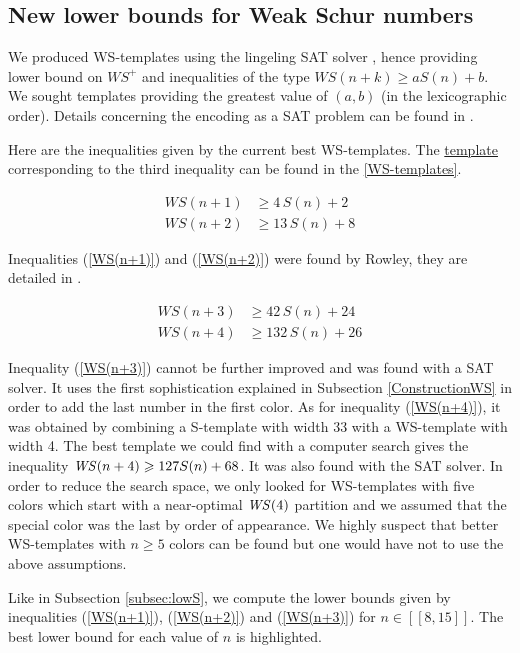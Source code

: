 \subsection{New lower bounds for Weak Schur numbers}

We produced WS-templates using the lingeling SAT solver \cite{Lingeling2017}, hence providing lower bound on \(WS^+\) 
and inequalities of the type \(WS(n+k) \geqslant a S(n) + b\). We sought templates providing the greatest value of \((a, b)\) 
(in the lexicographic order). Details concerning the encoding as a SAT problem can be found in \cite{Heule2017}.

\par
Here are the inequalities given by the current best WS-templates. The \hyperref[WS-templates]{template} 
corresponding to the third inequality can be found in the \ref{WS-templates}.

\begin{align}
	WS(n + 1) &\geqslant  4\,S(n)  +  2 \label{WS(n+1)} \\
	WS(n + 2) &\geqslant  13\,S(n)  +  8 \label{WS(n+2)} 
\end{align}

Inequalities (\ref{WS(n+1)}) and (\ref{WS(n+2)}) were found by Rowley, they are detailed in \cite{RowleyWS}.

\begin{align}
	WS(n + 3) &\geqslant  42\,S(n)  +  24 \label{WS(n+3)} \\
	WS(n + 4) &\geqslant  132\,S(n)  +  26 \label{WS(n+4)}
\end{align}

Inequality (\ref{WS(n+3)}) cannot be further improved and was found with a SAT solver. It uses the first 
sophistication explained in Subsection \ref{ConstructionWS} in order to add
the last number in the first color. As for inequality (\ref{WS(n+4)}), it was obtained by combining a S-template with 
width 33 with a WS-template with width 4. The best template we could find with a computer search gives the 
inequality \(\mathit{WS}(n+4) \geqslant 127 S(n) + 68\). It was also found with the SAT solver. In order to reduce the search space, 
we only looked for WS-templates with five colors which start with a near-optimal \(\mathit{WS}(4)\) partition and we assumed that the 
special color was the last by order of appearance. We highly suspect that better WS-templates with \(n \geqslant 5\) 
colors can be found but one would have not to use the above assumptions.

Like in  Subsection \ref{subsec:lowS}, we compute the lower bounds given by inequalities (\ref{WS(n+1)}),
(\ref{WS(n+2)}) and (\ref{WS(n+3)}) for \( n \in [\![8,15]\!] \). The best lower bound for each value of \(n\) is highlighted.

